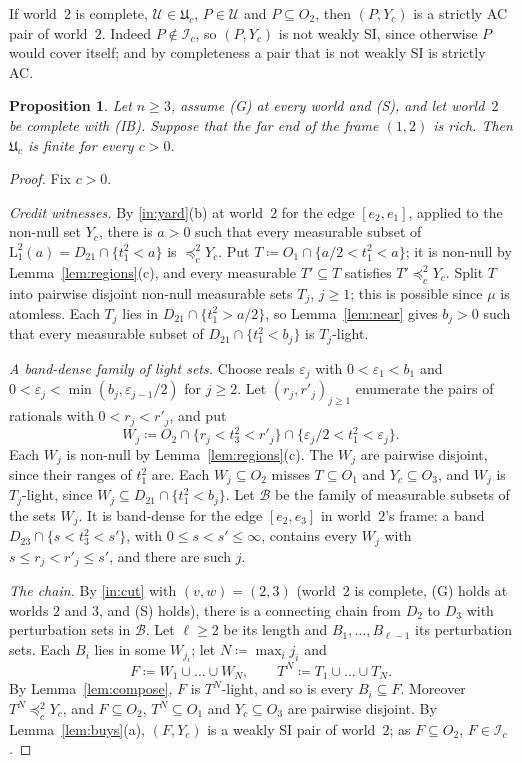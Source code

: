 \documentclass[11pt]{article}
\newtheorem{proposition}[theorem]{Proposition}
\theoremstyle{definition}\newtheorem{definition}[theorem]{Definition}
\theoremstyle{remark}\newtheorem{remark}[theorem]{Remark}
\newcommand{\Bfam}{\mathcal B}
\newcommand{\Iid}{\mathcal I}
\newcommand{\Uf}{\mathcal U}
\newcommand{\UU}{\mathfrak U}
\newcommand{\Lo}[3]{\mathrm L^{#1}_{#2}(#3)}
\begin{document}
If world~$2$ is complete, $\Uf\in\UU_c$, $P\in\Uf$ and $P\subseteq O_2$,
then $(P,Y_c)$ is a strictly AC pair of world~$2$. Indeed $P\notin\Iid_c$,
so $(P,Y_c)$ is not weakly SI, since otherwise $P$ would cover itself; and
by completeness a pair that is not weakly SI is strictly AC.

\begin{proposition}\label{prop:finite}
Let $n\ge3$, assume (G) at every world and (S), and let world~$2$ be
complete with (IB). Suppose that the far end of the frame $(1,2)$ is rich.
Then $\UU_c$ is finite for every $c>0$.
\end{proposition}
\begin{proof}
Fix $c>0$.

\emph{Credit witnesses.} By \ref{in:yard}(b) at world~$2$ for the edge
$[e_2,e_1]$, applied to the non-null set $Y_c$, there is $a>0$ such that
every measurable subset of $\Lo21a=D_{21}\cap\{t^2_1<a\}$ is
$\preceq^2_cY_c$. Put $T\coloneqq O_1\cap\{a/2<t^2_1<a\}$; it is non-null by
Lemma~\ref{lem:regions}(c), and every measurable $T'\subseteq T$ satisfies
$T'\preceq^2_cY_c$. Split $T$ into pairwise disjoint non-null measurable
sets $T_j$, $j\ge1$; this is possible since $\mu$ is atomless. Each $T_j$
lies in $D_{21}\cap\{t^2_1>a/2\}$, so Lemma~\ref{lem:near} gives $b_j>0$
such that every measurable subset of $D_{21}\cap\{t^2_1<b_j\}$ is
$T_j$-light.

\emph{A band-dense family of light sets.} Choose reals $\varepsilon_j$ with
$0<\varepsilon_1<b_1$ and $0<\varepsilon_j<\min(b_j,\varepsilon_{j-1}/2)$
for $j\ge2$. Let $(r_j,r'_j)_{j\ge1}$ enumerate the pairs of rationals
with $0<r_j<r'_j$, and put
\[
 W_j\coloneqq O_2\cap\{r_j<t^2_3<r'_j\}\cap
 \{\varepsilon_j/2<t^2_1<\varepsilon_j\}.
\]
Each $W_j$ is non-null by Lemma~\ref{lem:regions}(c). The $W_j$ are
pairwise disjoint, since their ranges of $t^2_1$ are. Each $W_j\subseteq
O_2$ misses $T\subseteq O_1$ and $Y_c\subseteq O_3$, and $W_j$ is
$T_j$-light, since $W_j\subseteq D_{21}\cap\{t^2_1<b_j\}$. Let $\Bfam$ be
the family of measurable subsets of the sets $W_j$. It is band-dense for
the edge $[e_2,e_3]$ in world~$2$'s frame: a band
$D_{23}\cap\{s<t^2_3<s'\}$, with $0\le s<s'\le\infty$, contains every $W_j$
with $s\le r_j<r'_j\le s'$, and there are such $j$.

\emph{The chain.} By \ref{in:cut} with $(v,w)=(2,3)$ (world~$2$ is
complete, (G) holds at worlds $2$ and $3$, and (S) holds), there is a
connecting chain from $D_2$ to $D_3$ with perturbation sets in $\Bfam$. Let
$\ell\ge2$ be its length and $B_1,\dots,B_{\ell-1}$ its perturbation sets.
Each $B_i$ lies in some $W_{j_i}$; let $N\coloneqq\max_ij_i$ and
\[
 F\coloneqq W_1\cup\dots\cup W_N,\qquad T^N\coloneqq T_1\cup\dots\cup T_N.
\]
By Lemma~\ref{lem:compose}, $F$ is $T^N$-light, and so is every
$B_i\subseteq F$. Moreover $T^N\preceq^2_cY_c$, and $F\subseteq O_2$,
$T^N\subseteq O_1$ and $Y_c\subseteq O_3$ are pairwise disjoint. By
Lemma~\ref{lem:buys}(a), $(F,Y_c)$ is a weakly SI pair of world~$2$; as
$F\subseteq O_2$, $F\in\Iid_c$.


\end{proof}
\end{document}
